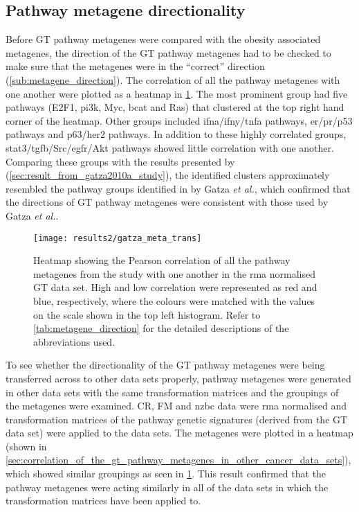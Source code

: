 \subsection{Pathway metagene directionality}
\label{sub:pathway_metagene_directionality}

Before GT pathway metagenes were compared with the obesity associated metagenes, the direction of the GT pathway metagenes had to be checked to make sure that the metagenes were in the ``correct'' direction (\cref{sub:metagene_direction}).
The correlation of all the pathway metagenes with one another were plotted as a heatmap in \cref{fig:gatza_meta_dir}.
The most prominent group had five pathways (E2F1, \gls{pi3k}, Myc, \gls{bcat} and Ras) that clustered at the top right hand corner of the heatmap.
Other groups included \gls{ifna}/\gls{ifny}/\gls{tnfa} pathways, \gls{er}/\gls{pr}/p53 pathways and p63/\gls{her2} pathways.
In addition to these highly correlated groups, \gls{stat3}/\gls{tgfb}/Src/\gls{egfr}/Akt pathways showed little correlation with one another.
Comparing these groups with the results presented by \citet{Gatza2010a} (\cref{sec:result_from_gatza2010a_study}), the identified clusters approximately resembled the pathway groups identified in by Gatza \textit{et al.}, which confirmed that the directions of GT pathway metagenes were consistent with those used by Gatza \textit{et al.}.

\begin{figure}[htpb]
	\centering
	\texttt{[image: results2/gatza\_meta\_trans]}
	\caption[Heatmap of the Pearson correlation of all the pathway metagenes with one another in the \acrshort{rma} normalised GT data]{Heatmap showing the Pearson correlation of all the pathway metagenes from the \citet{Gatza2010a} study with one another  in the \gls{rma} normalised GT data set.
		High and low correlation were represented as red and blue, respectively, where the colours were matched with the values on the scale shown in the top left histogram.
		Refer to \cref{tab:metagene_direction} for the detailed descriptions of the abbreviations used.
		}
	\label{fig:gatza_meta_dir}
\end{figure}

To see whether the directionality of the GT pathway metagenes were being transferred across to other data sets properly, pathway metagenes were generated in other data sets with the same transformation matrices and the groupings of the metagenes were examined.
CR, FM and \gls{nzbc} data were \gls{rma} normalised and transformation matrices of the pathway genetic signatures (derived from the GT data set) were applied to the data sets.
The metagenes were plotted in a heatmap (shown in \cref{sec:correlation_of_the_gt_pathway_metagenes_in_other_cancer_data_sets}), which showed similar groupings  as seen in \cref{fig:gatza_meta_dir}.
This result confirmed that the pathway metagenes were acting similarly in all of the data sets in which the transformation matrices have been applied to.

